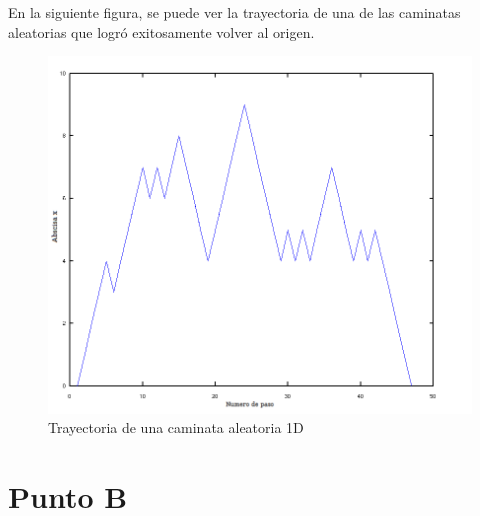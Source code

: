 \documentclass[a4paper,10pt]{article}
\begin{document}
En la siguiente figura, se puede ver la trayectoria de una de las caminatas aleatorias que logr\'o exitosamente volver al origen.
\begin{center}
  \begin{figure}[H]
  \includegraphics[scale=0.5]{./images/rec1edit.png}
    \caption{Trayectoria de una caminata aleatoria 1D}
  \end{figure}
\end{center} 
\newpage
\section{Punto B}
\end{document}
